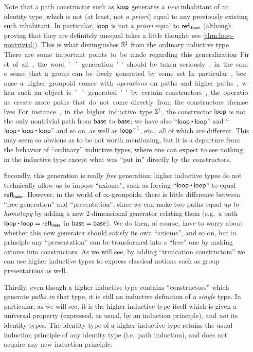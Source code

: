 Note that a path constructor such as $\mathsf{loop}$ generates a \emph{new} inhabitant of an identity type, which is not (at least, not \emph{a priori}) equal to any previously existing such inhabitant.
In particular, $\mathsf{loop}$ is not \emph{a priori} equal to $\mathsf{refl}_{\mathsf{base}}$ (although proving that they are definitely unequal takes a little thought; see \autoref{thm:loop-nontrivial}).
This is what distinguishes $\mathbb{S}^1$ from the ordinary inductive type \unit.

There are some important points to be made regarding this generalization.

First of all, the word ``generation'' should be taken seriously, in the same sense that a group can be freely generated by some set.
In particular, because a higher groupoid comes with \emph{operations} on paths and higher paths, when such an object is ``generated'' by certain constructors, the operations create more paths that do not come directly from the constructors themselves.
For instance, in the higher inductive type $\mathbb{S}^1$, the constructor $\mathsf{loop}$ is not the only nontrivial path from $\mathsf{base}$ to $\mathsf{base}$; we have also ``$\lloop\ct\lloop$'' and ``$\lloop\ct\lloop\ct\lloop$'' and so on, as well as $\mathord{{\mathsf{loop}}^{-1}}$, etc., all of which are different.
This may seem so obvious as to be not worth mentioning, but it is a departure from the behavior of ``ordinary'' inductive types, where one can expect to see nothing in the inductive type except what was ``put in'' directly by the constructors.

Secondly, this generation is really \emph{free} generation: higher inductive types do not technically allow us to impose ``axioms'', such as forcing ``$\lloop\ct\lloop$'' to equal $\mathsf{refl}_{\mathsf{base}}$.
However, in the world of $\infty$-groupoids,%
there is little difference between ``free generation'' and ``presentation'', since we can make two paths equal \emph{up to homotopy} by adding a new 2-di\-men\-sion\-al generator relating them (e.g.\ a path $\lloop\ct\lloop = \refl{\base}$ in $\mathsf{base}=\mathsf{base}$).
We do then, of course, have to worry about whether this new generator should satisfy its own ``axioms'', and so on, but in principle any ``presentation'' can be transformed into a ``free'' one by making axioms into constructors.
As we will see, by adding ``truncation constructors'' we can use higher inductive types to express classical notions such as group presentations as well.

Thirdly, even though a higher inductive type contains ``constructors'' which generate \emph{paths in} that type, it is still an inductive definition of a \emph{single} type.
In particular, as we will see, it is the higher inductive type itself which is given a universal property (expressed, as usual, by an induction principle), and \emph{not} its identity types.
The identity type of a higher inductive type retains the usual induction principle of any identity type (i.e.\ path induction), and does not acquire any new induction principle.

